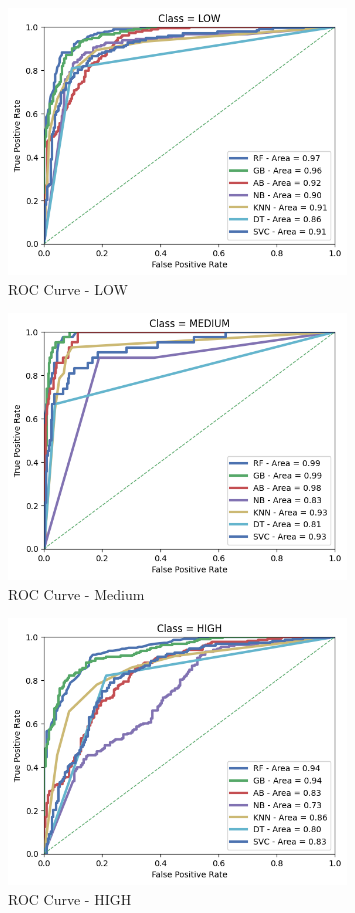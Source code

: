\begin{center}

    \begin{figure}[h!]
        \centering
        \includegraphics[width=0.8\textwidth]{imgs/roc low.png}
        \caption{ROC Curve - LOW}
        \label{fig:ROC LOW}
    \end{figure}
    \begin{figure}[h!]
        \centering
        \includegraphics[width=0.8\textwidth]{imgs/roc medium.png}
        \caption{ROC Curve - Medium}
        \label{fig:ROC ALL}
    \end{figure}
    \begin{figure}[h!]
        \centering
        \includegraphics[width=0.8\textwidth]{imgs/roc high.png}
        \caption{ROC Curve - HIGH}
        \label{fig:ROC HIGH}
    \end{figure}
\end{center}
\clearpage


